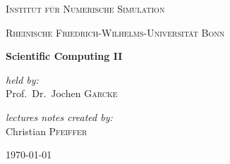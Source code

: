 \documentclass{scrbook}
\begin{document}
\frontmatter

\begin{titlepage}

	\centering

	\par\vspace{2.2cm}
	
	\textsc{\LARGE Institut für Numerische Simulation}\par\vspace{0.3cm}
	\textsc{\small Rheinische Friedrich-Wilhelms-Universität Bonn}\par\vspace{0.9cm}
	
	\vfill

	\begin{mdframed}[rightline=false,linewidth=0.5mm,leftline=false,innerbottommargin=\baselineskip,innertopmargin=\baselineskip]
	\centering\textbf{\huge Scientific Computing II}
	\end{mdframed}
	
	\vspace{1.5cm}
	
	\begin{minipage}{0.4\textwidth}
		\centering\large
		\textit{held by:} \\
		Prof.\ Dr.\ Jochen \textsc{Garcke}
	\end{minipage}
	\vfill
	\vfill
	\vfill
	\vfill
	\begin{minipage}{0.4\textwidth}
		\centering\large
		\textit{lectures notes created by:}\\
		Christian \textsc{Pfeiffer}
	\end{minipage}
	
	\vfill

	{\large \today}

\end{titlepage}

\printacronyms
\tableofcontents

\mainmatter












\backmatter
\printindex[keydefinitions]
\printbibliography[heading=bibintoc]
\end{document}
